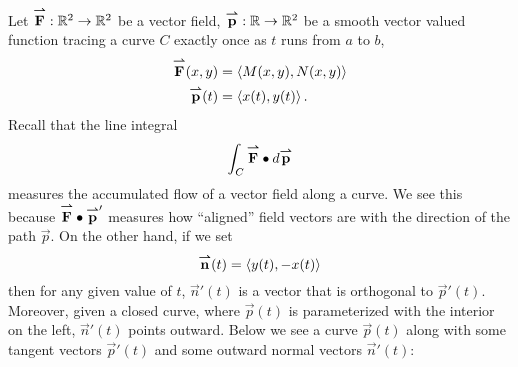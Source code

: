 \documentclass{ximera}
\begin{document}
Let ${\overset{\boldsymbol{\rightharpoonup}}{\mathbf{F}}}:\mathbb R^2\to\mathbb R^2$ be a vector field,
${\overset{\boldsymbol{\rightharpoonup}}{\mathbf{p}}}:\mathbb R\to\mathbb R^2$ be a smooth vector valued function tracing a curve
$C$ exactly once as $t$ runs from $a$ to $b$,
\begin{align*}
  {\overset{\boldsymbol{\rightharpoonup}}{\mathbf{F}}}(x,y) &= \left\langle M(x,y), N(x,y)\right\rangle\\
  {\overset{\boldsymbol{\rightharpoonup}}{\mathbf{p}}}(t) &= \left\langle x(t),y(t)\right\rangle.
\end{align*}
Recall that the line integral
\[
\int_C {\overset{\boldsymbol{\rightharpoonup}}{\mathbf{F}}}\bullet\mathop{}\!d{\overset{\boldsymbol{\rightharpoonup}}{\mathbf{p}}}
\]
measures the accumulated flow of a vector field along a curve. We see
this because ${\overset{\boldsymbol{\rightharpoonup}}{\mathbf{F}}}\bullet{\overset{\boldsymbol{\rightharpoonup}}{\mathbf{p}}}'$ measures how ``aligned'' field
vectors are with the direction of the path $\vec{p}$. On the other
hand, if we set
\[
{\overset{\boldsymbol{\rightharpoonup}}{\mathbf{n}}}(t) = \left\langle y(t),-x(t)\right\rangle
\]
then for any given value of $t$, $\vec{n}'(t)$ is a vector that is
orthogonal to $\vec{p}'(t)$. Moreover, given a closed curve, where
$\vec{p}(t)$ is parameterized with the interior on the left,
$\vec{n}'(t)$ points outward. Below we see a curve $\vec{p}(t)$ along
with some tangent vectors $\vec{p}'(t)$ and some outward normal
vectors $\vec{n}'(t)$:
\end{document}
